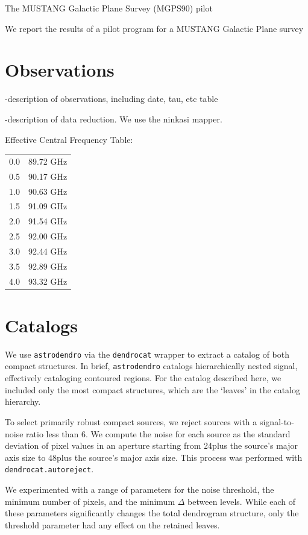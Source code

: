 \documentclass[twocolumn]{aastex62}
\begin{document}
The MUSTANG Galactic Plane Survey (MGPS90) pilot

We report the results of a pilot program for a MUSTANG Galactic Plane survey

\section{Observations}

-description of observations, including date, tau, etc table

-description of data reduction.  We use the ninkasi mapper.


Effective Central Frequency Table:

\begin{tabular}{ll}
0.0 & 89.72 GHz \\
0.5 & 90.17 GHz \\
1.0 & 90.63 GHz \\
1.5 & 91.09 GHz \\
2.0 & 91.54 GHz \\
2.5 & 92.00 GHz \\
3.0 & 92.44 GHz \\
3.5 & 92.89 GHz \\
4.0 & 93.32 GHz 
\end{tabular}

\section{Catalogs}

We use \texttt{astrodendro} via the \texttt{dendrocat} wrapper to extract a
catalog of both compact structures.  In brief, \texttt{astrodendro} catalogs
hierarchically nested signal, effectively cataloging contoured regions.  For
the catalog described here, we included only the most compact structures, which
are the `leaves' in the catalog hierarchy.

To select primarily robust compact sources, we reject sources with a signal-to-noise
ratio less than 6.  We compute the noise for each source as the standard deviation
of pixel values in an aperture starting from 24\arcsec plus the source's major axis
size to 48\arcsec plus the source's major axis size.  This process was performed with
\texttt{dendrocat.autoreject}.

We experimented with a range of parameters for the noise threshold, the minimum
number of pixels, and the minimum $\Delta$ between levels.  While each of these
parameters significantly changes the total dendrogram structure, only the
threshold parameter had any effect on the retained leaves.
\end{document}
